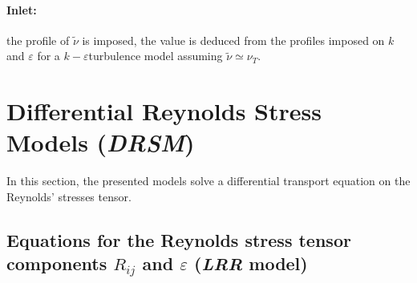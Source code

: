 \paragraph{Inlet:} 
the profile of $\tilde{\nu}$ is imposed, the value is deduced from the profiles imposed on $k$ and $\varepsilon$ for a $k-\varepsilon$turbulence 
model assuming $\tilde{\nu } \simeq \nu_T$.



\section{Differential Reynolds Stress Models (\emph{DRSM})}
In this section, the presented models solve a differential transport equation
on the Reynolds' stresses tensor.
\subsection{Equations for the Reynolds stress tensor components $R_{ij}$ 
and $\varepsilon$ (\emph{LRR} model)}
%


